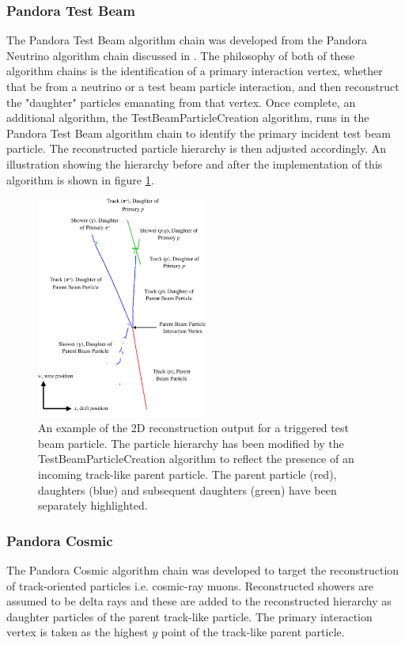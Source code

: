 \subsubsection{Pandora Test Beam}
The Pandora Test Beam algorithm chain was developed from the Pandora Neutrino algorithm chain discussed in \cite{pandorauboone}.  The philosophy of both of these algorithm chains is the identification of a primary interaction vertex, whether that be from a neutrino or a test beam particle interaction, and then reconstruct the "daughter" particles emanating from that vertex.  Once complete, an additional algorithm, the TestBeamParticleCreation algorithm, runs in the Pandora Test Beam algorithm chain to identify the primary incident test beam particle.  The reconstructed particle hierarchy is then adjusted accordingly.  An illustration showing the hierarchy before and after the implementation of this algorithm is shown in figure \ref{fig:testbeamcreation}.

\begin{figure}
\centering
\includegraphics[width=0.5\textwidth]{Figures/EventDisplays/MC/TestBeamParticleCreation.pdf}
\caption{An example of the 2D reconstruction output for a triggered test beam particle.  The particle hierarchy has been modified by the TestBeamParticleCreation algorithm to reflect the presence of an incoming track-like parent particle.  The parent particle (red), daughters (blue) and subsequent daughters (green) have been separately highlighted.}
\label{fig:testbeamcreation}
\end{figure}

\subsubsection{Pandora Cosmic}
\label{sec:pandoracosmic}
The Pandora Cosmic algorithm chain \cite{pandorauboone} was developed to target the reconstruction of track-oriented particles i.e. cosmic-ray muons.  Reconstructed showers are assumed to be delta rays and these are added to the reconstructed hierarchy as daughter particles of the parent track-like particle.  The primary interaction vertex is taken as the highest $y$ point of the track-like parent particle.


